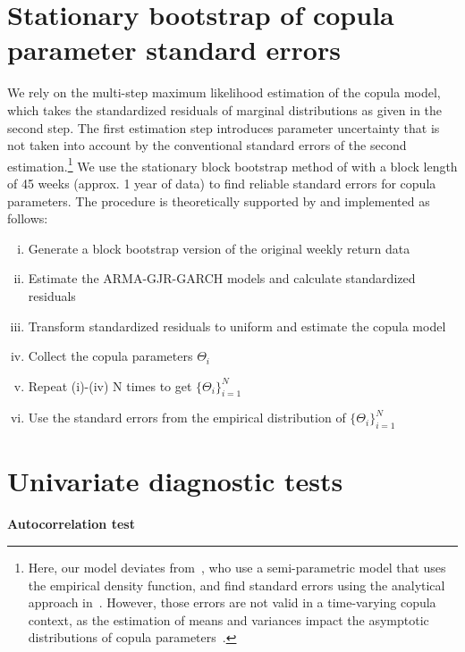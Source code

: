 \newpage

\section{Stationary bootstrap of copula parameter standard errors} \label{App:Appendix_bootstrap}
We rely on the multi-step maximum likelihood estimation of the copula model, which takes the standardized residuals of marginal distributions as given in the second step. The first estimation step introduces parameter uncertainty that is not taken into account by the conventional standard errors of the second estimation.\footnote{Here, our model deviates from~\textcite{ChristoffersenLanglois2013}, who use a semi-parametric model that uses the empirical density function, and find standard errors using the analytical approach in~\textcite{ChenFan2006}. However, those errors are not valid in a time-varying copula context, as the estimation of means and variances impact the asymptotic distributions of copula parameters~\autocite{Remillard2010}.} We use the stationary block bootstrap method of \textcite{PolitisRomano1994} with a block length of 45 weeks (approx. 1 year of data) to find reliable standard errors for copula parameters. The procedure is theoretically supported by \textcite{GonclavesWhite2004} and implemented as follows:
\begin{enumerate}[(i)]
    \item Generate a block bootstrap version of the original weekly return data
    \item Estimate the ARMA-GJR-GARCH models and calculate standardized residuals
    \item Transform standardized residuals to uniform and estimate the copula model
    \item Collect the copula parameters $\Theta_i$
    \item Repeat (i)-(iv) N times to get $\{\Theta_i\}^{N}_{i=1}$
    \item Use the standard errors from the empirical distribution of $\{\Theta_i\}^{N}_{i=1}$
\end{enumerate}

\newpage

\section{Univariate diagnostic tests}
\label{app:univariate_diagnostics}

\textbf{Autocorrelation test}

